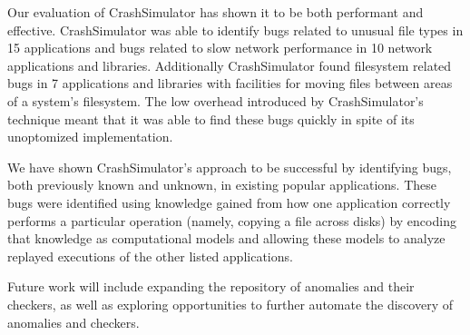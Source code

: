 Our evaluation of CrashSimulator has shown it to be both performant and
effective.  CrashSimulator was able to identify bugs related to unusual file
types in 15 applications and bugs related to slow network performance in 10
network applications and libraries.  Additionally CrashSimulator found
filesystem related bugs in 7 applications and libraries with facilities for
moving files between areas of a system's filesystem.  The low overhead
introduced by CrashSimulator's technique meant that it was able to
find these bugs quickly in spite of its unoptomized implementation.

We have shown CrashSimulator's approach to be successful by identifying bugs, both previously known and unknown, in
existing popular applications.  These bugs were identified using knowledge gained from how one application correctly
performs a particular operation (namely, copying a file across disks) by encoding that knowledge as computational models
and allowing these models to analyze replayed executions of the other listed applications.

Future work will include expanding the repository of anomalies and their checkers, as well as exploring opportunities to further automate the discovery of anomalies and checkers.
